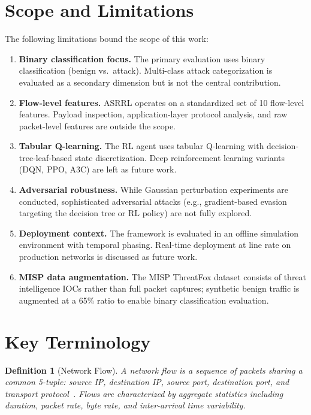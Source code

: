 \documentclass[12pt, letterpaper, oneside]{report}
\newtheorem{definition}{Definition}[chapter]
\newcommand{\ASRRL}{\textsc{ASRRL}}
\begin{document}
\section{Scope and Limitations}
\label{sec:limitations}

The following limitations bound the scope of this work:

\begin{enumerate}
    \item \textbf{Binary classification focus.} The primary evaluation uses binary classification (benign vs.\ attack). Multi-class attack categorization is evaluated as a secondary dimension but is not the central contribution.

    \item \textbf{Flow-level features.} \ASRRL{} operates on a standardized set of 10 flow-level features. Payload inspection, application-layer protocol analysis, and raw packet-level features are outside the scope.

    \item \textbf{Tabular Q-learning.} The RL agent uses tabular Q-learning with decision-tree-leaf-based state discretization. Deep reinforcement learning variants (DQN, PPO, A3C) are left as future work.

    \item \textbf{Adversarial robustness.} While Gaussian perturbation experiments are conducted, sophisticated adversarial attacks (e.g., gradient-based evasion targeting the decision tree or RL policy) are not fully explored.

    \item \textbf{Deployment context.} The framework is evaluated in an offline simulation environment with temporal phasing. Real-time deployment at line rate on production networks is discussed as future work.

    \item \textbf{MISP data augmentation.} The MISP ThreatFox dataset consists of threat intelligence IOCs rather than full packet captures; synthetic benign traffic is augmented at a 65\% ratio to enable binary classification evaluation.
\end{enumerate}


\section{Key Terminology}
\label{sec:terminology}

\begin{definition}[Network Flow]
A network flow is a sequence of packets sharing a common 5-tuple: source IP, destination IP, source port, destination port, and transport protocol~\cite{lee1998}. Flows are characterized by aggregate statistics including duration, packet rate, byte rate, and inter-arrival time variability.
\end{definition}
\end{document}
